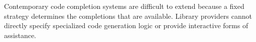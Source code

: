 
Contemporary code completion systems are difficult to extend because a fixed strategy determines the completions that are available. Library providers cannot directly specify specialized code generation logic or provide interactive forms of assistance. 


